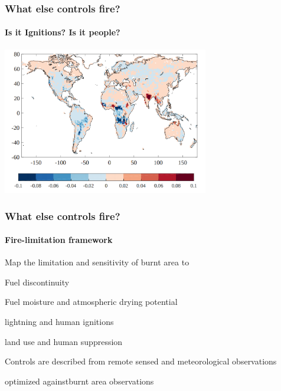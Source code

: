 
\begin{frame}
    \frametitle{What else controls fire?}
    \framesubtitle{Is it Ignitions? Is it people?}
    \includegraphics[width=9.0cm]{images/INFERNO}%
\end{frame}


\begin{frame}
    \frametitle{What else controls fire?}
    \framesubtitle{Fire-limitation framework}
	\begin{itemize}
		 {\item Map the limitation and sensitivity of burnt area to}
        \begin{itemize}
             {\item Fuel discontinuity}
             {\item Fuel moisture and atmospheric drying potential}
             {\item lightning and human ignitions}
             {\item land use and human suppression}
        \end{itemize}
		 {\item Controls are described from remote sensed and meteorological observations}
		 {\item optimized againstburnt area observations}
	\end{itemize}
\end{frame}
